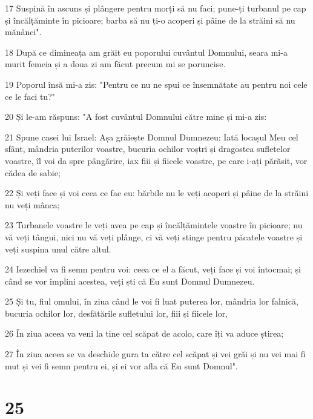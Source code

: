 \par 17 Suspină în ascuns și plângere pentru morți să nu faci; pune-ți turbanul pe cap și încălțăminte în picioare; barba să nu ți-o acoperi și pâine de la străini să nu mănânci".
\par 18 După ce dimineața am grăit eu poporului cuvântul Domnului, seara mi-a murit femeia și a doua zi am făcut precum mi se poruncise.
\par 19 Poporul însă mi-a zis: "Pentru ce nu ne spui ce însemnătate au pentru noi cele ce le faci tu?"
\par 20 Și le-am răspuns: "A fost cuvântul Domnului către mine și mi-a zis:
\par 21 Spune casei lui Israel: Așa grăiește Domnul Dumnezeu: Iată locașul Meu cel sfânt, mândria puterilor voastre, bucuria ochilor voștri și dragostea sufletelor voastre, îl voi da spre pângărire, iax fiii și fiicele voastre, pe care i-ați părăsit, vor cădea de sabie;
\par 22 Și veți face și voi ceea ce fac eu: bărbile nu le veți acoperi și pâine de la străini nu veți mânca;
\par 23 Turbanele voastre le veți avea pe cap și încălțămintele voastre în picioare; nu vă veți tângui, nici nu vă veți plânge, ci vă veți stinge pentru păcatele voastre și veți suspina unul către altul.
\par 24 Iezechiel va fi semn pentru voi: ceea ce el a făcut, veți face și voi întocmai; și când se vor împlini acestea, veți ști că Eu sunt Domnul Dumnezeu.
\par 25 Și tu, fiul omului, în ziua când le voi fi luat puterea lor, mândria lor falnică, bucuria ochilor lor, desfătările sufletului lor, fiii și fiicele lor,
\par 26 În ziua aceea va veni la tine cel scăpat de acolo, care îți va aduce știrea;
\par 27 În ziua aceea se va deschide gura ta către cel scăpat și vei grăi și nu vei mai fi mut și vei fi semn pentru ei, și ei vor afla că Eu sunt Domnul".

\chapter{25}

